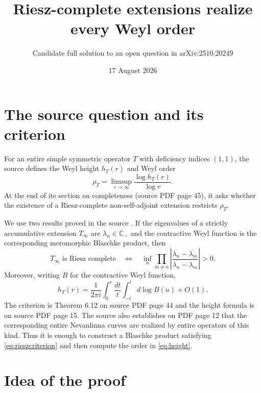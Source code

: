 \documentclass[11pt]{article}
\title{Riesz-complete extensions realize every Weyl order}
\author{Candidate full solution to an open question in arXiv:2510.20249}
\date{17 August 2026}
\newcommand{\C}{\mathbb C}
\begin{document}
\maketitle

\begin{center}
\end{center}

\section{The source question and its criterion}

For an entire simple symmetric operator $T$ with deficiency indices $(1,1)$,
the source defines the Weyl height $h_T(r)$ and Weyl order
\[
 \rho_T=\limsup_{r\to\infty}\frac{\log h_T(r)}{\log r}.
\]
At the end of its section on completeness (source PDF page 45), it asks
whether the existence of a Riesz-complete non-self-adjoint extension restricts
$\rho_T$.

We use two results proved in the source \cite{Wang}.  If the eigenvalues of a
strictly accumulative extension $T_\infty$ are
$\lambda_n\in\C_-$ and the contractive Weyl function is the corresponding
meromorphic Blaschke product, then
\begin{equation}\label{eq:rieszcriterion}
 T_\infty\text{ is Riesz complete}
 \quad\Longleftrightarrow\quad
 \inf_n\prod_{m\ne n}
 \left|\frac{\overline{\lambda_n}-\overline{\lambda_m}}
 {\overline{\lambda_n}-\lambda_m}\right|>0.
\end{equation}
Moreover, writing $B$ for the contractive Weyl function,
\begin{equation}\label{eq:height}
 h_T(r)=\frac{1}{2\pi i}\int_0^r\frac{dt}{t}
       \int_{-t}^{t}d\log B(u)+O(1).
\end{equation}
The criterion is Theorem 6.12 on source PDF page 44 and the height formula is
on source PDF page 15.  The source also establishes on PDF page 12 that the
corresponding entire Nevanlinna curves are realized by entire operators of
this kind.  Thus it is
enough to construct a Blaschke product satisfying \eqref{eq:rieszcriterion}
and then compute the order in \eqref{eq:height}.

\section{Idea of the proof}
\end{document}
